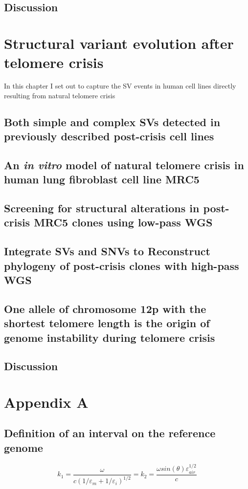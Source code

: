 \documentclass[phd,tocprelim]{cornell}
\begin{document}
\section{Discussion}


\chapter{Structural variant evolution after telomere crisis}
In this chapter I set out to capture the SV events in human cell lines directly resulting from natural telomere crisis

\section{Both simple and complex SVs detected in previously described post-crisis cell lines}

\section{An \textit{in vitro} model of natural telomere crisis in human lung fibroblast cell line MRC5}

\section{Screening for structural alterations in post-crisis MRC5 clones using low-pass WGS}

\section{Integrate SVs and SNVs to Reconstruct phylogeny of post-crisis clones with high-pass WGS}

\section{One allele of chromosome 12p with the shortest telomere length is the origin of genome instability during telomere crisis}

\section{Discussion}

\appendix
\chapter{Appendix A}

\section{Definition of an interval on the reference genome}

\cite{aiw}

\begin{equation}
    k_1=\frac{\omega }{c({1/\varepsilon_m + 1/\varepsilon_i})^{1/2}}=k_2=\frac{\omega
    sin(\theta)\varepsilon_{air}^{1/2}}{c}
\end{equation}



\end{document}
